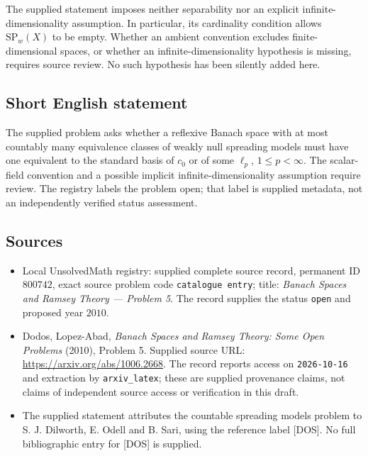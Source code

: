 \documentclass[11pt]{article}
\begin{document}
The supplied statement imposes neither separability nor an explicit infinite-dimensionality assumption. In particular, its cardinality condition allows \(\mathrm{SP}_w(X)\) to be empty. Whether an ambient convention excludes finite-dimensional spaces, or whether an infinite-dimensionality hypothesis is missing, requires source review. No such hypothesis has been silently added here.
\subsection{Short English statement}
The supplied problem asks whether a reflexive Banach space with at most countably many equivalence classes of weakly null spreading models must have one equivalent to the standard basis of \(c_0\) or of some \(\ell_p\), \(1\leq p<\infty\). The scalar-field convention and a possible implicit infinite-dimensionality assumption require review. The registry labels the problem open; that label is supplied metadata, not an independently verified status assessment.
\subsection{Sources}
\begin{itemize}
\item Local UnsolvedMath registry: supplied complete source record, permanent ID \(800742\), exact source problem code \texttt{catalogue entry}; title: \emph{Banach Spaces and Ramsey Theory --- Problem 5}. The record supplies the status \texttt{open} and proposed year \(2010\).
\item Dodos, Lopez-Abad, \emph{Banach Spaces and Ramsey Theory: Some Open Problems} (2010), Problem 5. Supplied source URL: \url{https://arxiv.org/abs/1006.2668}. The record reports access on \texttt{2026-10-16} and extraction by \texttt{arxiv\_latex}; these are supplied provenance claims, not claims of independent source access or verification in this draft.
\item The supplied statement attributes the countable spreading models problem to S. J. Dilworth, E. Odell and B. Sari, using the reference label [DOS]. No full bibliographic entry for [DOS] is supplied.
\end{itemize}
\end{document}
